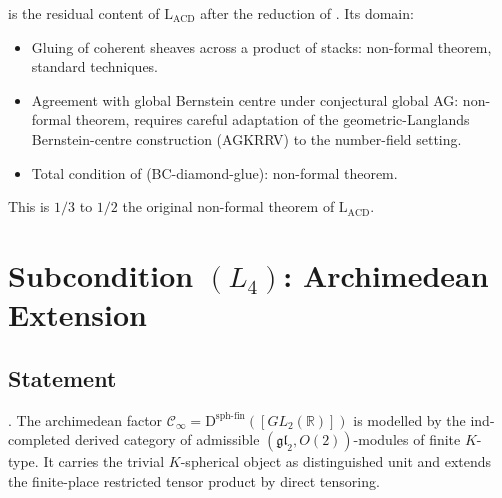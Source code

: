 \begin{remark}
\label{v4-arith:acd:rem:L3-residual-domain}
 is the residual
content of \(\mathrm{L}_{\mathrm{ACD}}\) after the reduction of
. Its domain:
\begin{itemize}
\item Gluing of coherent sheaves across a product of stacks:
non-formal theorem, standard techniques.
\item Agreement with global Bernstein centre under conjectural
global AG: non-formal theorem, requires careful adaptation of
the geometric-Langlands Bernstein-centre construction (AGKRRV) to the
number-field setting.
\item Total condition of (BC-diamond-glue): non-formal theorem.
\end{itemize}
This is \(1/3\) to \(1/2\) the original non-formal theorem of
\(\mathrm{L}_{\mathrm{ACD}}\).
\end{remark}

\section{Subcondition \((L_{4})\): Archimedean Extension}
\label{v4-arith:acd:L4}

\subsection{Statement}

\begin{theorem}
\label{v4-arith:acd:thm:L4-closed}
\ClaimStatusProvedHere. The archimedean factor
\(\mathcal{C}_{\infty}=\mathrm{D}^{\mathrm{sph\text{-}fin}}([GL_{2}(\mathbb{R})])\)
is modelled by the ind-completed derived category of admissible
\((\mathfrak{gl}_{2},O(2))\)-modules of finite \(K\)-type.  It carries
the trivial \(K\)-spherical object as distinguished unit and extends
the finite-place restricted tensor product by direct tensoring.
\end{theorem}

